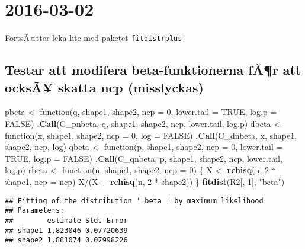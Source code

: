 \documentclass[]{article}
\newenvironment{Shaded}{\begin{snugshade}}{\end{snugshade}}
\newcommand{\KeywordTok}[1]{\textcolor[rgb]{0.13,0.29,0.53}{\textbf{{#1}}}}
\newcommand{\DataTypeTok}[1]{\textcolor[rgb]{0.13,0.29,0.53}{{#1}}}
\newcommand{\DecValTok}[1]{\textcolor[rgb]{0.00,0.00,0.81}{{#1}}}
\newcommand{\StringTok}[1]{\textcolor[rgb]{0.31,0.60,0.02}{{#1}}}
\newcommand{\OtherTok}[1]{\textcolor[rgb]{0.56,0.35,0.01}{{#1}}}
\newcommand{\NormalTok}[1]{{#1}}
\begin{document}
\section{2016-03-02}\label{section-2}

FortsÃ¤tter leka lite med paketet \texttt{fitdistrplus}

\subsection{Testar att modifera beta-funktionerna fÃ¶r att ocksÃ¥ skatta
ncp
(misslyckas)}\label{testar-att-modifera-beta-funktionerna-far-att-ocksa-skatta-ncp-misslyckas}

\begin{Shaded}
\begin{Highlighting}[]
\NormalTok{pbeta <-}\StringTok{ }\NormalTok{function(q, shape1, shape2, }\DataTypeTok{ncp =} \DecValTok{0}\NormalTok{, }\DataTypeTok{lower.tail =} \OtherTok{TRUE}\NormalTok{, }\DataTypeTok{log.p =} \OtherTok{FALSE}\NormalTok{) }
  \KeywordTok{.Call}\NormalTok{(C_pnbeta, q, shape1, shape2, ncp, lower.tail, log.p)}
\NormalTok{dbeta <-}\StringTok{ }\NormalTok{function(x, shape1, shape2, }\DataTypeTok{ncp =} \DecValTok{0}\NormalTok{, }\DataTypeTok{log =} \OtherTok{FALSE}\NormalTok{)}
  \KeywordTok{.Call}\NormalTok{(C_dnbeta, x, shape1, shape2, ncp, log)}
\NormalTok{qbeta <-}\StringTok{ }\NormalTok{function(p, shape1, shape2, }\DataTypeTok{ncp =} \DecValTok{0}\NormalTok{, }\DataTypeTok{lower.tail =} \OtherTok{TRUE}\NormalTok{, }\DataTypeTok{log.p =} \OtherTok{FALSE}\NormalTok{)}
  \KeywordTok{.Call}\NormalTok{(C_qnbeta, p, shape1, shape2, ncp, lower.tail, log.p)}
\NormalTok{rbeta <-}\StringTok{ }\NormalTok{function(n, shape1, shape2, }\DataTypeTok{ncp =} \DecValTok{0}\NormalTok{) \{}
        \NormalTok{X <-}\StringTok{ }\KeywordTok{rchisq}\NormalTok{(n, }\DecValTok{2} \NormalTok{*}\StringTok{ }\NormalTok{shape1, }\DataTypeTok{ncp =} \NormalTok{ncp)}
        \NormalTok{X/(X +}\StringTok{ }\KeywordTok{rchisq}\NormalTok{(n, }\DecValTok{2} \NormalTok{*}\StringTok{ }\NormalTok{shape2))}
    \NormalTok{\}}
\KeywordTok{fitdist}\NormalTok{(R2[, }\DecValTok{1}\NormalTok{], }\StringTok{"beta"}\NormalTok{)}
\end{Highlighting}
\end{Shaded}

\begin{verbatim}
## Fitting of the distribution ' beta ' by maximum likelihood 
## Parameters:
##        estimate Std. Error
## shape1 1.823046 0.07720639
## shape2 1.881074 0.07998226
\end{verbatim}
\end{document}
